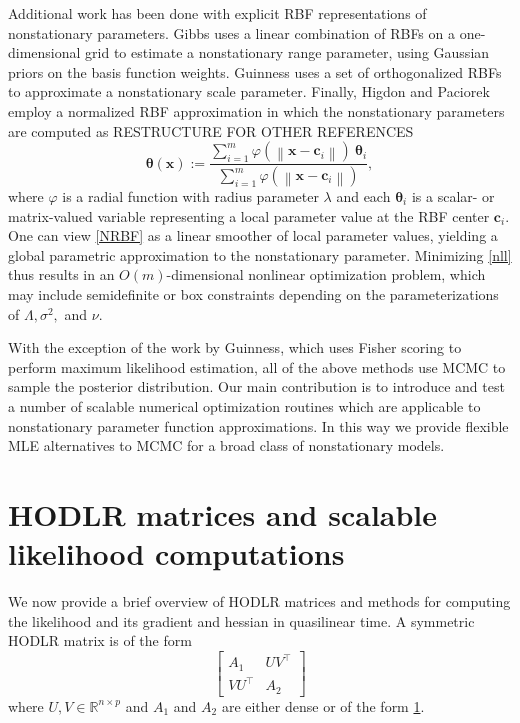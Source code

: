 \documentclass{article}
\newcommand{\norm}[1]{\left\lVert#1\right\rVert}
\newcommand{\mat}[1]{\begin{bmatrix}#1\end{bmatrix}}
\newcommand{\R}{\mathbb{R}}
\numberwithin{equation}{section}
\begin{document}
Additional work has been done with explicit RBF representations of nonstationary parameters. Gibbs \cite{gibbs1997bayesian} uses a linear combination of RBFs on a one-dimensional grid to estimate a nonstationary range parameter, using Gaussian priors on the basis function weights. Guinness \cite{guinness2019gaussian} uses a set of orthogonalized RBFs to approximate a nonstationary scale parameter. Finally, Higdon \cite{higdon1998process} and Paciorek \cite{paciorek2003nonstationary} employ a normalized RBF approximation in which the nonstationary parameters are computed as RESTRUCTURE FOR OTHER REFERENCES
\begin{equation}
  \bm{\theta}(\mathbf{x}) := \frac{\sum_{i=1}^m \varphi(\norm{\mathbf{x} - \mathbf{c}_i}) \ \bm{\theta}_i}{\sum_{i=1}^m \varphi(\norm{\mathbf{x} - \mathbf{c}_i})},
  \label{NRBF}
\end{equation}
where $\varphi$ is a radial function with radius parameter $\lambda$ and each $\bm{\theta}_i$ is a scalar- or matrix-valued variable representing a local parameter value at the RBF center $\mathbf{c}_i$. One can view \ref{NRBF} as a linear smoother of local parameter values, yielding a global parametric approximation to the nonstationary parameter. Minimizing \ref{nll} thus results in an $O(m)$-dimensional nonlinear optimization problem, which may include semidefinite or box constraints depending on the parameterizations of $\Lambda, \sigma^2,$ and $\nu$.

With the exception of the work by Guinness, which uses Fisher scoring to perform maximum likelihood estimation, all of the above methods use MCMC to sample the posterior distribution. Our main contribution is to introduce and test a number of scalable numerical optimization routines which are applicable to nonstationary parameter function approximations. In this way we provide flexible MLE alternatives to MCMC for a broad class of nonstationary models.

\section{HODLR matrices and scalable likelihood computations} \label{HODLR}
We now provide a brief overview of HODLR matrices and methods for computing the likelihood and its gradient and hessian in quasilinear time. A symmetric HODLR matrix is of the form
\begin{equation}
  \mat{A_1 & UV^\top \\ VU^\top & A_2}
  \label{HODLR}
\end{equation}
where $U, V \in \R^{n \times p}$ and $A_1$ and $A_2$ are either dense or of the form \ref{HODLR}.
\end{document}

